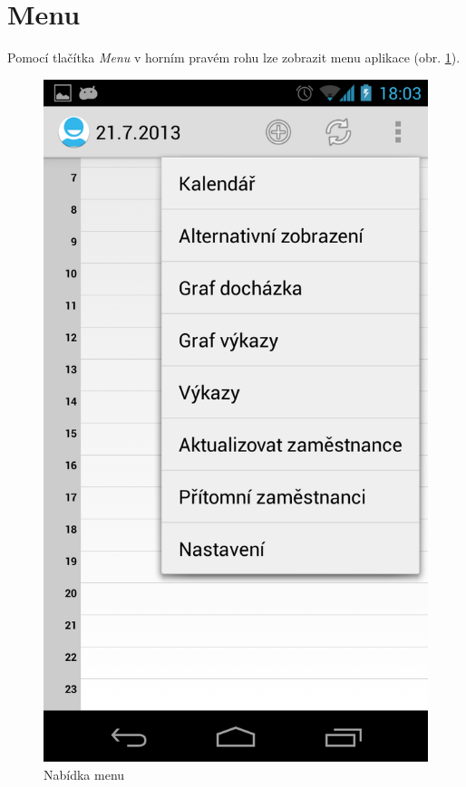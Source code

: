 \documentclass{diplomka}
\begin{document}
\section{Menu}
Pomocí tlačítka \emph{Menu} v horním pravém rohu lze zobrazit menu aplikace (obr. \ref{fig:menu}).

\begin{figure}[H]
\centering
\begin{minipage}{.45\textwidth}
  \centering
  \includegraphics[width=.9\linewidth]{scr/menu.png}
 \caption{Nabídka menu}
  \label{fig:menu}
\end{minipage}\hfill%
\begin{minipage}{.45\textwidth}
   \centering

\end{minipage}
\end{figure}
\end{document}
